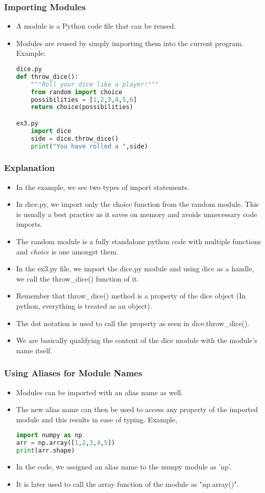 \documentclass{beamer}
\begin{document}
\begin{frame}[fragile]
\frametitle{Importing Modules}
\begin{itemize}
\item A module is a Python code file that can be reused.
\item Modules are reused by simply importing them into the current program. Example:
\begin{lstlisting}[language=Python]
dice.py
def throw_dice():
	"""Roll your dice like a player!"""
	from random import choice
	possibilities = [1,2,3,4,5,6]
	return choice(possibilities)

ex3.py
	import dice
	side = dice.throw_dice()
	print("You have rolled a ",side)
\end{lstlisting}
\end{itemize}
\end{frame}

\begin{frame}[fragile]
\frametitle{Explanation}
\begin{itemize}
\item In the example, we see two types of import statements.
\item In dice.py, we import only the choice function from the random module. This is usually a best practice as it saves on memory and avoids unnecessary code imports.
\item The random module is a fully standalone python code  with multiple functions and \textit{choice} is one amongst them.
\item In the ex3.py file, we import the dice.py module and using dice as a handle, we call the throw\_dice() function of it.
\item Remember that throw\_dice() method is a property  of the dice object (In python, everything is treated as an object).
\item The dot notation is used to call the property as seen in dice.throw\_dice().
\item We are basically qualifying the content of the dice module with the module's name itself.
\end{itemize}
\end{frame}

\begin{frame}[fragile]
\frametitle{Using Aliases for Module Names}
\begin{itemize}
\item Modules can be imported with an alias name as well.
\item The new alias name can then be used to access any property of the imported module and this results in ease of typing.
Example,
\begin{lstlisting}[language=Python]
import numpy as np
arr = np.array([1,2,3,4,5])
print(arr.shape)
\end{lstlisting}
\item In the code, we assigned an alias name to the numpy module as 'np'.
\item It is later used to call the array function of the module as "np.array()".
\end{itemize}
\end{frame}
\end{document}
